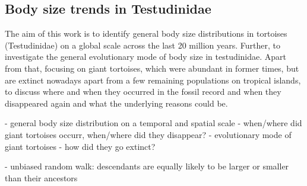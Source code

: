  

\subsection{Body size trends in Testudinidae}

The aim of this work is to identify general body size distributions in tortoises (Testudinidae) on a global scale across the last 20 million years. Further, to investigate the general evolutionary mode of body size in testudinidae. 
Apart from that, focusing on giant tortoises, which were abundant in former times, but are extinct nowadays apart from a few remaining populations on tropical islands, to discuss where and when they occurred in the fossil record and when they disappeared again and what the underlying reasons could be.

- general body size distribution on a temporal and spatial scale
- when/where did giant tortoises occurr, when/where did they disappear?
- evolutionary mode of giant tortoises
- how did they go extinct?


- unbiased random walk: descendants are equally likely to be larger or smaller than their ancestors


